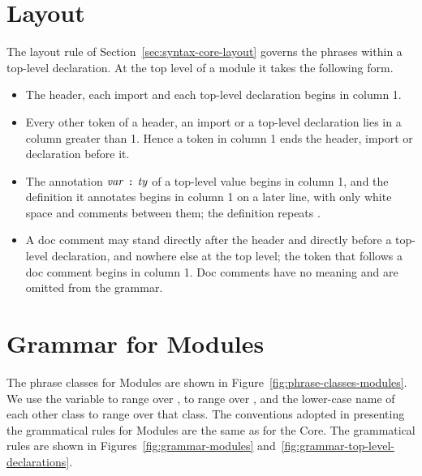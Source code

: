 \section{Layout}\label{sec:syntax-modules-layout}

The layout rule of Section~\ref{sec:syntax-core-layout} governs the phrases
within a top-level declaration. At the top level of a module it takes the
following form.
\begin{itemize}
\item The header, each import and each top-level declaration begins in column
  1.
\item Every other token of a header, an import or a top-level declaration lies
  in a column greater than 1. Hence a token in column 1 ends the header,
  import or declaration before it.
\item The annotation $\var\ \kw{:}\ \ty$ of a top-level value begins in column
  1, and the definition it annotates begins in column 1 on a later line, with
  only white space and comments between them; the definition repeats \var.
\item A doc comment may stand directly after the header and directly before a
  top-level declaration, and nowhere else at the top level; the token that
  follows a doc comment begins in column 1. Doc comments have no meaning and
  are omitted from the grammar.
\end{itemize}

\section{Grammar for Modules}\label{sec:syntax-modules-grammar}

The phrase classes for Modules are shown in Figure~\ref{fig:phrase-classes-modules}.
We use the variable \modm{} to range over , \expitem{} to range
over , and the lower-case name of each other class to range over
that class. The conventions adopted in presenting the grammatical rules for
Modules are the same as for the Core. The grammatical rules are shown in
Figures~\ref{fig:grammar-modules} and~\ref{fig:grammar-top-level-declarations}.

